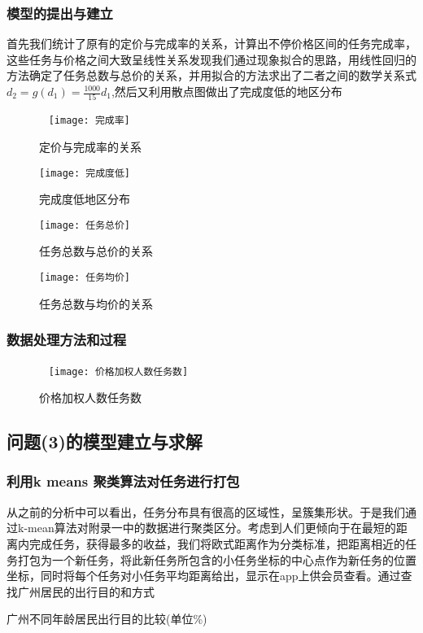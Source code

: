 \documentclass{ctexart}
\begin{document}
\subsubsection{模型的提出与建立}
首先我们统计了原有的定价与完成率的关系，计算出不停价格区间的任务完成率，这些任务与价格之间大致呈线性关系发现我们通过现象拟合的思路，用线性回归的方法确定了任务总数与总价的关系，并用拟合的方法求出了二者之间的数学关系式$d_2=g(d_1)=\frac{1000}{15}d_1$,然后又利用散点图做出了完成度低的地区分布
\begin{figure}[htbp]  
\centering
\texttt{[image: 完成率]} 
\caption{定价与完成率的关系}
\end{figure}
\begin{figure}[htbp] 
\centering
\texttt{[image: 完成度低]} 
\caption{完成度低地区分布}
\end{figure}
\begin{figure}[htbp] 
\centering
\texttt{[image: 任务总价]} 
\caption{任务总数与总价的关系}
\end{figure}
\begin{figure}[htbp] 
\centering
\texttt{[image: 任务均价]} 
\caption{任务总数与均价的关系}
\end{figure}

\subsubsection{数据处理方法和过程}
\begin{figure}[htbp]  
\centering
\texttt{[image: 价格加权人数任务数]} 
\caption{价格加权人数任务数}
\end{figure}
\newpage
\subsection{问题(3)的模型建立与求解}
\subsubsection{利用k means 聚类算法对任务进行打包}
从之前的分析中可以看出，任务分布具有很高的区域性，呈簇集形状。于是我们通过k-mean算法对附录一中的数据进行聚类区分。考虑到人们更倾向于在最短的距离内完成任务，获得最多的收益，我们将欧式距离作为分类标准，把距离相近的任务打包为一个新任务，将此新任务所包含的小任务坐标的中心点作为新任务的位置坐标，同时将每个任务对小任务平均距离给出，显示在app上供会员查看。通过查找广州居民的出行目的和方式

\centerline{广州不同年龄居民出行目的比较(单位\%)}
\end{document}
